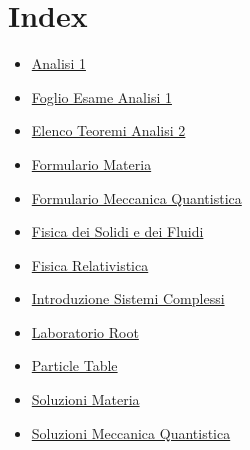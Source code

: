 \documentclass{article}
\begin{document}
\section{Index}

\begin{itemize}
\item \href{source/analisi_1.html}{Analisi 1}
\item \href{source/foglio_esame_analisi1.html}{Foglio Esame Analisi 1}
\item \href{source/elenco_teoremi_analisi_2.html}{Elenco Teoremi Analisi 2}
\item \href{source/formulario_materia.html}{Formulario Materia}
\item \href{source/formulario_meccanica_quantistica.html}{Formulario Meccanica Quantistica}
\item \href{source/fisica_dei_solidi_e_dei_fluidi.html}{Fisica dei Solidi e dei Fluidi}
\item \href{source/fisica_relativistica.html}{Fisica Relativistica}
\item \href{source/introduzione_sistemi_complessi.html}{Introduzione Sistemi Complessi}
\item \href{source/laboratorio_root.html}{Laboratorio Root}
\item \href{source/particle_table.html}{Particle Table}
\item \href{source/soluzioni_materia.html}{Soluzioni Materia}
\item \href{source/soluzioni_meccanica_quantistica.html}{Soluzioni Meccanica Quantistica}
\end{itemize}
\end{document}
